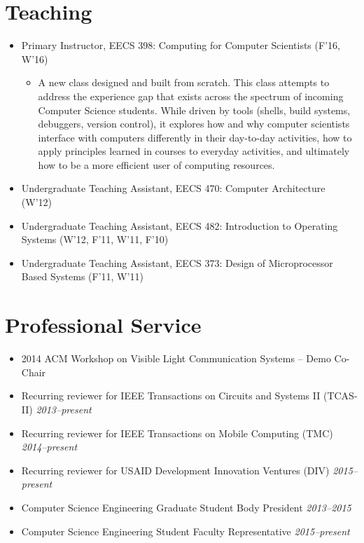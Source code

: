 \documentclass{article}
\begin{document}
\section*{Teaching}

\begin{itemize}

  \item[] Primary Instructor, EECS 398: Computing for Computer Scientists (F'16, W'16)
    \begin{itemize}
      \item[] A new class designed and built from scratch. This class attempts
        to address the experience gap that exists across the spectrum of
        incoming Computer Science students. While driven by tools (shells,
        build systems, debuggers, version control), it explores how and why
        computer scientists interface with computers differently in their
        day-to-day activities, how to apply principles learned in courses to
        everyday activities, and ultimately how to be a more efficient user of
        computing resources.
    \end{itemize}
  \item[] Undergraduate Teaching Assistant, EECS 470: Computer Architecture (W'12)
  \item[] Undergraduate Teaching Assistant, EECS 482: Introduction to Operating Systems (W'12, F'11, W'11, F'10)
  \item[] Undergraduate Teaching Assistant, EECS 373: Design of Microprocessor Based Systems (F'11, W'11)

\end{itemize}

\section*{Professional Service}

\begin{itemize}

  \item[] 2014 ACM Workshop on Visible Light Communication Systems -- Demo Co-Chair
  \item[] Recurring reviewer for IEEE Transactions on Circuits and Systems II (TCAS-II)
    \emph{2013--present}
  \item[] Recurring reviewer for IEEE Transactions on Mobile Computing (TMC)
    \emph{2014--present}
  \item[] Recurring reviewer for USAID Development Innovation Ventures (DIV)
    \emph{2015--present}
  \item[] Computer Science Engineering Graduate Student Body President
    \emph{2013--2015}
  \item[] Computer Science Engineering Student Faculty Representative
    \emph{2015--present}

\end{itemize}
\end{document}
